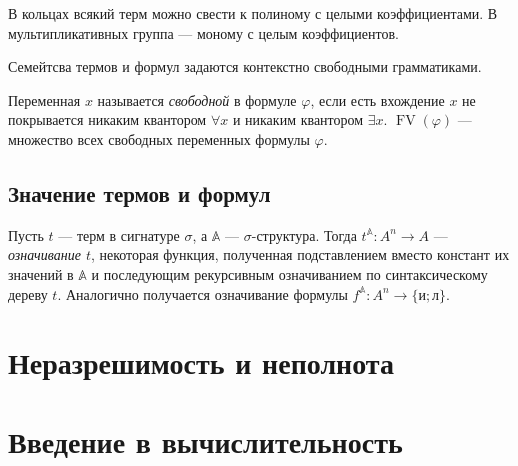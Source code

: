 \documentclass[a4paper,11pt]{article}
\newcommand{\FV}{\mathop{\mathrm{FV}}}
\begin{document}
\begin{exmpl}
	В кольцах всякий терм можно свести к полиному с целыми коэффициентами. В мультипликативных группа --- моному с целым коэффициентов.
\end{exmpl}

\begin{task}
	Семейтсва термов и формул задаются контекстно свободными грамматиками.
\end{task}

\begin{definition}
	Переменная $x$ называется \emph{свободной} в формуле $\varphi$, если есть вхождение $x$ не покрывается никаким квантором $\forall x$ и никаким квантором $\exists x$. $\FV(\varphi)$ --- множество всех свободных переменных формулы $\varphi$.
\end{definition}

\subsection{Значение термов и формул}

\begin{definition}
	Пусть $t$ --- терм в сигнатуре $\sigma$, а $\mathbb{A}$ --- $\sigma$-структура. Тогда $t^{\mathbb{A}}: A^n \to A$ --- \emph{означивание $t$}, некоторая функция, полученная подставлением вместо констант их значений в $\mathbb{A}$ и последующим рекурсивным означиванием по синтаксическому дереву $t$. Аналогично получается означивание формулы $f^{\mathbb{A}}: A^n \to \{\text{и}; \text{л}\}$.
\end{definition}

\section{Неразрешимость и неполнота}

\section{Введение в вычислительность}

\end{document}

